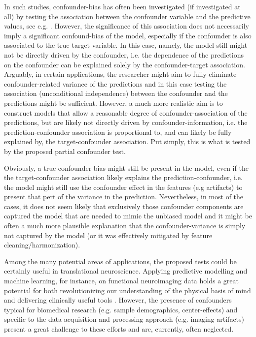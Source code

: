 \documentclass{article}
\begin{document}
In such studies, confounder-bias has often been investigated (if investigated at all) by testing the association between the confounder variable and the predictive values, see e.g. \citep{spisak2020pain}.
However, the significance of this association does not necessarily imply a significant confound-bias of the model, especially if the confounder is also associated to the true target variable. In this case, namely, the model still might not be directly driven by the confounder, i.e. the dependence of the predictions on the confounder can be explained solely by the confounder-target association. 
Arguably, in certain applications, the researcher might aim to fully eliminate confounder-related variance of the predictions and in this case testing the association (unconditional independence) between the confounder and the predictions might be sufficient. However, a much more realistic aim is to construct models that allow a reasonable degree of confounder-association of the predictions, but are likely not directly driven by confounder-information, i.e. the prediction-confounder association is proportional to, and can likely be fully explained by, the target-confounder association.
Put simply, this is what is tested by the proposed partial confounder test.

Obviously, a true confounder bias might still be present in the model, even if the the target-confounder association likely explains the prediction-confounder, i.e. the model might still use the confounder effect in the features (e.g artifacts) to present that pert of the variance in the prediction. Nevertheless, in most of the cases, it does not seem likely that exclusively those confounder components are captured the model that are needed to mimic the unbiased model and it might be often a much more plausible explanation that the confounder-variance is simply not captured by the model (or it was effectively mitigated by feature cleaning/harmonization).

Among the many potential areas of applications, the proposed tests could be certainly useful in translational neuroscience. Applying predictive modelling and machine learning, for instance, on functional neuroimaging data holds a great potential for both revolutionizing our understanding of the physical basis of mind and delivering clinically useful tools \citep{woo2017building, wager2013fmri, spisak2020pain}. However, the presence of confounders typical for biomedical research (e.g. sample demographics, center-effects) and specific to the data acquisition and processing approach (e.g. imaging artifacts) present a great challenge to these efforts and are, currently, often neglected.
\end{document}
